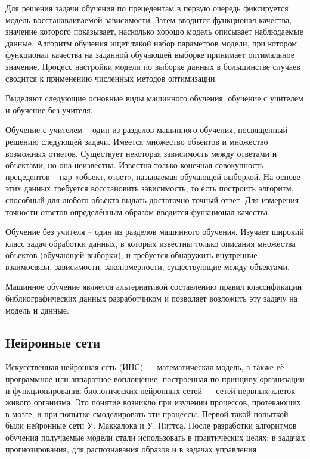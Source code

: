 Для решения задачи обучения по прецедентам в первую очередь фиксируется модель восстанавливаемой зависимости. Затем вводится функционал качества, значение которого показывает, насколько хорошо модель описывает наблюдаемые данные. Алгоритм обучения ищет такой набор параметров модели, при котором функционал качества на заданной обучающей выборке принимает оптимальное значение. Процесс настройки модели по выборке данных в большинстве случаев сводится к применению численных методов оптимизации. 

Выделяют следующие основные виды машинного обучения: обучение с учителем и обучение без учителя.

Обучение с учителем -- один из разделов машинного обучения, посвященный решению следующей задачи. Имеется множество объектов и множество возможных ответов. Существует некоторая зависимость между ответами и объектами, но она неизвестна. Известна только конечная совокупность прецедентов -- пар «объект, ответ», называемая обучающей выборкой. На основе этих данных требуется восстановить зависимость, то есть построить алгоритм, способный для любого объекта выдать достаточно точный ответ. Для измерения точности ответов определённым образом вводится функционал качества. 

Обучение без учителя -- один из разделов машинного обучения. Изучает широкий класс задач обработки данных, в которых известны только описания множества объектов (обучающей выборки), и требуется обнаружить внутренние взаимосвязи, зависимости, закономерности, существующие между объектами.

Машинное обучение является альтернативой составлению правил классификации библиографических данных разработчиком и позволяет возложить эту задачу на модель и данные.

\subsection{Нейронные сети}
Искусственная нейронная сеть (ИНС) — математическая модель, а также её программное или аппаратное воплощение, построенная по принципу организации и функционирования биологических нейронных сетей — сетей нервных клеток живого организма. Это понятие возникло при изучении процессов, протекающих в мозге, и при попытке смоделировать эти процессы. Первой такой попыткой были нейронные сети У. Маккалока и У. Питтса. После разработки алгоритмов обучения получаемые модели стали использовать в практических целях: в задачах прогнозирования, для распознавания образов и в задачах управления.

